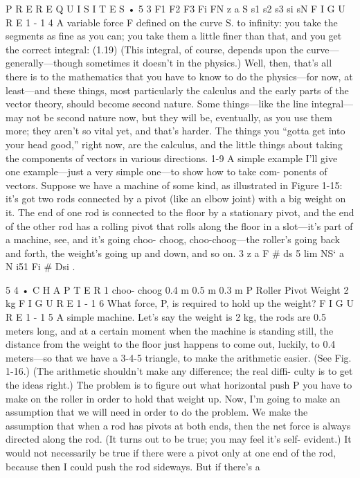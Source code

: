 \documentclass[10pt,oneside]{article}
\begin{document}
P R E R E Q U I S I T E S • 5 3 F1 F2 F3 Fi FN z a S s1 s2 s3 si sN F I G U R E 1 - 1 4 A variable force F defined on the curve S. to infinity: you take the segments as fine as you can; you take them a little finer than that, and you get the correct integral: (1.19) (This integral, of course, depends upon the curve---generally---though sometimes it doesn’t in the physics.) Well, then, that’s all there is to the mathematics that you have to know to do the physics---for now, at least---and these things, most particularly the calculus and the early parts of the vector theory, should become second nature. Some things---like the line integral---may not be second nature now, but they will be, eventually, as you use them more; they aren’t so vital yet, and that’s harder. The things you “gotta get into your head good,” right now, are the calculus, and the little things about taking the components of vectors in various directions. 1-9 A simple example I’ll give one example---just a very simple one---to show how to take com- ponents of vectors. Suppose we have a machine of some kind, as illustrated in Figure 1-15: it’s got two rods connected by a pivot (like an elbow joint) with a big weight on it. The end of one rod is connected to the floor by a stationary pivot, and the end of the other rod has a rolling pivot that rolls along the floor in a slot---it’s part of a machine, see, and it’s going choo- choog, choo-choog---the roller’s going back and forth, the weight’s going up and down, and so on. 3 z a F \# ds 5 lim NS` a N i51 Fi \# Dsi .\par

5 4 • C H A P T E R  1 choo- choog 0.4 m 0.5 m 0.3 m P Roller Pivot Weight 2 kg F I G U R E 1 - 1 6 What force, P, is required to hold up the weight? F I G U R E 1 - 1 5 A simple machine. Let’s say the weight is 2 kg, the rods are 0.5 meters long, and at a certain moment when the machine is standing still, the distance from the weight to the floor just happens to come out, luckily, to 0.4 meters---so that we have a 3-4-5 triangle, to make the arithmetic easier. (See Fig. 1-16.) (The arithmetic shouldn’t make any difference; the real diffi- culty is to get the ideas right.) The problem is to figure out what horizontal push P you have to make on the roller in order to hold that weight up. Now, I’m going to make an assumption that we will need in order to do the problem. We make the assumption that when a rod has pivots at both ends, then the net force is always directed along the rod. (It turns out to be true; you may feel it’s self- evident.) It would not necessarily be true if there were a pivot only at one end of the rod, because then I could push the rod sideways. But if there’s a\par
\end{document}
